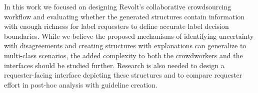 


In this work we focused on designing Revolt's collaborative crowdsourcing workflow and evaluating whether the generated structures contain information with enough richness for label requesters to define accurate label decision boundaries. 
While we believe the proposed mechanisms of identifying uncertainty with disagreements and creating structures with explanations can generalize to multi-class scenarios, the added complexity to both the crowdworkers and the interfaces should be studied further. Research is also needed to design a requester-facing interface depicting these structures and to compare requester effort in post-hoc analysis with guideline creation. 

